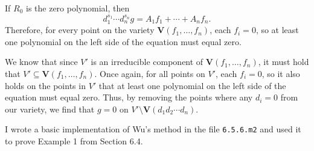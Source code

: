 \documentclass{article}
\theoremstyle{plain}
\theoremstyle{definition}
\theoremstyle{remark}
\begin{document}
If $R_0$ is the zero polynomial, then $$d_{1}^{s_1} \cdots d_n^{s_n} g = A_1 f_1 + \cdots + A_n f_n.$$
Therefore, for every point on the variety $\textbf{V}(f_1,\dots,f_n)$, each $f_i = 0$, so at least one polynomial on the left side of the equation must equal zero. 

We know that since $V'$ is an irreducible component of $\textbf{V}(f_1,\dots,f_n)$, it must hold that $V' \subseteq \textbf{V}(f_1,\dots,f_n)$.
Once again, for all points on $V'$, each $f_i = 0$, so it also holds on the points in $V'$ that at least one polynomial on the left side of the equation must equal zero.  
Thus, by removing the points where any $d_i = 0$ from our variety, we find that $g = 0$ on $V' \setminus \textbf{V}(d_1d_2\cdots d_n)$. 

I wrote a basic implementation of Wu's method in the file \texttt{6.5.6.m2} and used it to prove Example 1 from Section 6.4. 
\end{document}
